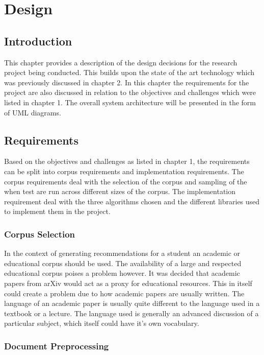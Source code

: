 \chapter{Design}

\section{Introduction}
This chapter provides a description of the design decisions for the research project being conducted.
This builds upon the state of the art technology which was previously discussed in chapter 2.
In this chapter the requirements for the project are also discussed in relation to the objectives and challenges which were listed in chapter 1.
The overall system architecture will be presented in the form of UML diagrams.

\section{Requirements}
Based on the objectives and challenges as listed in chapter 1, the requirements can be split into corpus requirements and implementation requirements.
The corpus requirements deal with the selection of the corpus and sampling of the when test are run across different sizes of the corpus.
The implementation requirement deal with the three algorithms chosen and the different libraries used to implement them in the project.

\subsection{Corpus Selection}
In the context of generating recommendations for a student an academic or educational corpus should be used.
The availability of a large and respected educational corpus poises a problem however.
It was decided that academic papers from arXiv would act as a proxy for educational resources.
This in itself could create a problem due to how academic papers are usually written.
The language of an academic paper is usually quite different to the language used in a textbook or a lecture.
The language used is generally an advanced discussion of a particular subject, which itself could have it's own vocabulary.

\subsection{Document Preprocessing}

